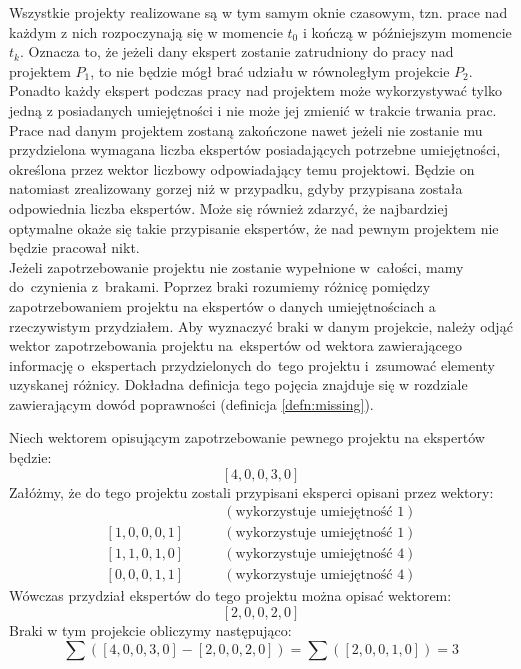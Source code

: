 \documentclass[12pt,a4paper]{article}
\theoremstyle{definition}
\begin{document}
\vspace{0.5em}
\noindent
Wszystkie projekty realizowane są w tym samym oknie czasowym, tzn. prace nad każdym z nich rozpoczynają się w momencie $t_0$ i kończą w późniejszym momencie $t_k$. Oznacza to, że jeżeli dany ekspert zostanie zatrudniony do pracy nad projektem $P_1$, to nie będzie mógł brać udziału w równoległym projekcie $P_2$. Ponadto każdy ekspert podczas pracy nad projektem może wykorzystywać tylko jedną z posiadanych umiejętności i nie może jej zmienić w trakcie trwania prac.\\

\noindent
Prace nad danym projektem zostaną zakończone nawet jeżeli nie zostanie mu przydzielona wymagana liczba ekspertów posiadających potrzebne umiejętności, określona przez wektor liczbowy odpowiadający temu projektowi. Będzie on natomiast zrealizowany gorzej niż w przypadku, gdyby przypisana została odpowiednia liczba ekspertów. Może się również zdarzyć, że najbardziej optymalne okaże się takie przypisanie ekspertów, że nad pewnym projektem nie będzie pracował nikt.\\

\noindent
Jeżeli zapotrzebowanie projektu nie zostanie wypełnione w~całości, mamy do~czynienia z~brakami. Poprzez braki rozumiemy różnicę pomiędzy zapotrzebowaniem projektu na ekspertów o danych umiejętnościach a rzeczywistym przydziałem. Aby wyznaczyć braki w danym projekcie, należy odjąć wektor zapotrzebowania projektu na~ekspertów od wektora zawierającego informację o~ekspertach przydzielonych do~tego projektu i~zsumować elementy uzyskanej różnicy. Dokładna definicja tego pojęcia znajduje się w rozdziale zawierającym dowód poprawności (definicja \ref{defn:missing}).\\

\begin{tcolorbox}[title=Przykład --- obliczanie liczby braków]
Niech wektorem opisującym zapotrzebowanie pewnego projektu na ekspertów będzie:
$$[4, 0, 0, 3, 0]$$
Załóżmy, że do tego projektu zostali przypisani eksperci opisani przez wektory:
\begin{align*}
[1, 0, 1, 0, 1] & \qquad (\text{wykorzystuje umiejętność }1) \\
[1, 0, 0, 0, 1] & \qquad (\text{wykorzystuje umiejętność }1) \\
[1, 1, 0, 1, 0] & \qquad (\text{wykorzystuje umiejętność }4) \\
[0, 0, 0, 1, 1] & \qquad (\text{wykorzystuje umiejętność }4)
\end{align*}
Wówczas przydział ekspertów do tego projektu można opisać wektorem:
$$[2, 0, 0, 2, 0]$$
Braki w tym projekcie obliczymy następująco:
$$\sum([4, 0, 0, 3, 0] - [2, 0, 0, 2, 0]) = \sum([2, 0, 0, 1, 0]) = 3$$
\end{tcolorbox}
\end{document}
